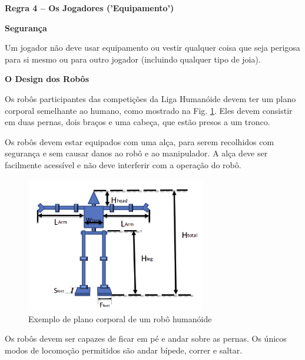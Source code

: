 \clearpage
\sffamily
{\bfseries\color[rgb]{0.4,0.4,0.4}
Regra 4 – Os Jogadores ('Equipamento')}
{}

\bigskip

{\bfseries Segurança }

\headlinebox

Um jogador não deve usar equipamento ou vestir qualquer coisa que seja perigosa para si mesmo ou para outro jogador (incluindo qualquer tipo de joia).

\bigskip

{\bfseries O Design dos Robôs}

\headlinebox

Os robôs participantes das competições da Liga Humanóide devem ter um plano corporal semelhante ao humano, como mostrado na Fig. \ref{fig:bodyplan}. Eles devem consistir em duas pernas, dois braços e uma cabeça, que estão presos a um tronco.

\bigskip

Os robôs devem estar equipados com uma alça, para serem recolhidos com segurança e sem causar danos ao robô e ao manipulador. A alça deve ser facilmente acessível e não deve interferir com a operação do robô.

\begin{figure}[h]
\begin{center}
\includegraphics[width=0.7\textwidth]{img/bodyplan.png}
\caption{Exemplo de plano corporal de um robô humanóide}
\label{fig:bodyplan}
\vspace{-3ex}
\end{center}
\end{figure}


Os robôs devem ser capazes de ficar em pé e andar sobre as pernas.
Os únicos modos de locomoção permitidos são andar bípede, correr e saltar.

